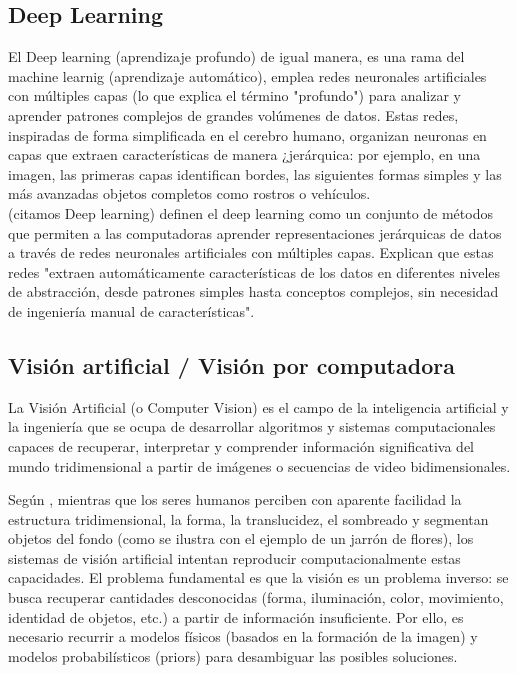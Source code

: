 \subsection{Deep Learning}

El Deep learning (aprendizaje profundo) de igual manera, es una rama del machine learnig (aprendizaje automático), emplea redes neuronales artificiales con múltiples capas (lo que explica el término "profundo") para analizar y aprender patrones complejos de grandes volúmenes de datos. Estas redes, inspiradas de forma simplificada en el cerebro humano, organizan neuronas en capas que extraen características de manera ¿jerárquica: por ejemplo, en una imagen, las primeras capas identifican bordes, las siguientes formas simples y las más avanzadas objetos completos como rostros o vehículos.\\

(citamos Deep learning) definen el deep learning como un conjunto de métodos que permiten a las computadoras aprender representaciones jerárquicas de datos a través de redes neuronales artificiales con múltiples capas. Explican que estas redes "extraen automáticamente características de los datos en diferentes niveles de abstracción, desde patrones simples hasta conceptos complejos, sin necesidad de ingeniería manual de características".

\subsection{Visión artificial / Visión por computadora}

La Visión Artificial (o Computer Vision) es el campo de la inteligencia artificial y la ingeniería que se ocupa de desarrollar algoritmos y sistemas computacionales capaces de recuperar, interpretar y comprender información significativa del mundo tridimensional a partir de imágenes o secuencias de video bidimensionales.

Según \cite{szeliski2010}, mientras que los seres humanos perciben con aparente facilidad la estructura tridimensional, la forma, la translucidez, el sombreado y segmentan objetos del fondo (como se ilustra con el ejemplo de un jarrón de flores), los sistemas de visión artificial intentan reproducir computacionalmente estas capacidades. El problema fundamental es que la visión es un problema inverso: se busca recuperar cantidades desconocidas (forma, iluminación, color, movimiento, identidad de objetos, etc.) a partir de información insuficiente. Por ello, es necesario recurrir a modelos físicos (basados en la formación de la imagen) y modelos probabilísticos (priors) para desambiguar las posibles soluciones.

